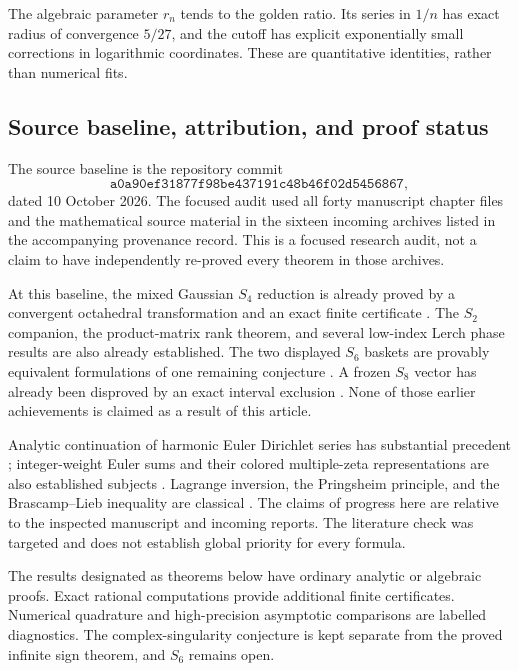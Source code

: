 The algebraic parameter $r_n$ tends to the golden ratio. Its series in $1/n$ has exact
radius of convergence $5/27$, and the cutoff has explicit exponentially
small corrections in logarithmic coordinates. These are quantitative
identities, rather than numerical fits.

\subsection{Source baseline, attribution, and proof status}
\label{sec:baseline}

The source baseline is the repository commit
\[
 \texttt{a0a90ef31877f98be437191c48b46f02d5456867},
\]
dated 10 October 2026. The focused audit used all forty manuscript chapter
files and the mathematical source material in the sixteen incoming
archives listed in the accompanying provenance record. This is a focused
research audit, not a claim to have independently re-proved every theorem
in those archives.

At this baseline, the mixed Gaussian $S_4$ reduction is already proved
by a convergent octahedral transformation and an exact finite certificate
\cite{ProjectS4}. The $S_2$ companion, the product-matrix rank theorem,
and several low-index Lerch phase results are also already established.
The two displayed $S_6$ baskets are provably equivalent formulations of
one remaining conjecture \cite{ProjectQuotients}. A frozen $S_8$ vector
has already been disproved by an exact interval exclusion
\cite{ProjectDiscovery}. None of those earlier achievements is claimed
as a result of this article.

Analytic continuation of harmonic Euler Dirichlet series has substantial
precedent \cite{BGP}; integer-weight Euler sums and their colored
multiple-zeta representations are also established subjects
\cite{XuWang}. Lagrange inversion, the Pringsheim principle, and the
Brascamp--Lieb inequality are classical \cite{Gessel2016,Flajolet,BL}.
The claims of progress here are relative to the inspected manuscript and
incoming reports. The literature check was targeted and does not establish
global priority for every formula.

The results designated as theorems below have ordinary analytic or
algebraic proofs. Exact rational computations provide additional finite
certificates. Numerical quadrature and high-precision asymptotic
comparisons are labelled diagnostics. The complex-singularity conjecture
is kept separate from the proved infinite sign theorem, and $S_6$ remains
open.

